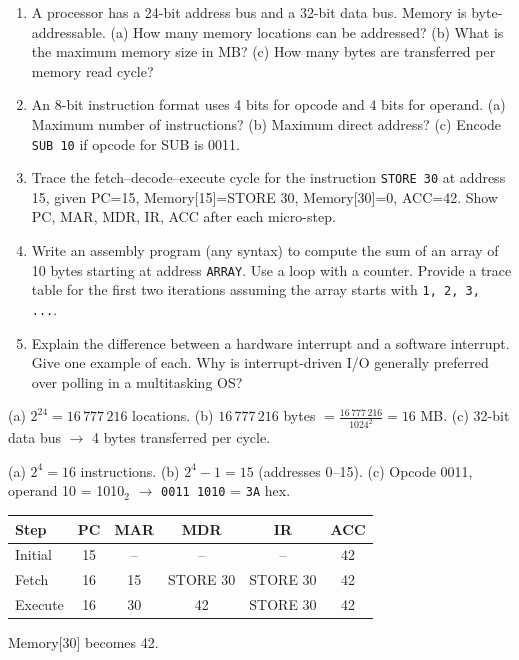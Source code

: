\documentclass[11pt]{article}
\begin{document}
\begin{exercice}
\begin{enumerate}
\item A processor has a 24-bit address bus and a 32-bit data bus. Memory is byte-addressable. (a) How many memory locations can be addressed? (b) What is the maximum memory size in MB? (c) How many bytes are transferred per memory read cycle?
\item An 8-bit instruction format uses 4 bits for opcode and 4 bits for operand. (a) Maximum number of instructions? (b) Maximum direct address? (c) Encode \texttt{SUB 10} if opcode for SUB is 0011.
\item Trace the fetch–decode–execute cycle for the instruction \texttt{STORE 30} at address 15, given PC=15, Memory[15]=STORE 30, Memory[30]=0, ACC=42. Show PC, MAR, MDR, IR, ACC after each micro-step.
\item Write an assembly program (any syntax) to compute the sum of an array of 10 bytes starting at address \texttt{ARRAY}. Use a loop with a counter. Provide a trace table for the first two iterations assuming the array starts with \texttt{1, 2, 3, ...}.
\item Explain the difference between a hardware interrupt and a software interrupt. Give one example of each. Why is interrupt-driven I/O generally preferred over polling in a multitasking OS?
\end{enumerate}
\end{exercice}

\begin{corrige}[Exercise 1]
(a) $2^{24} = 16\,777\,216$ locations. (b) $16\,777\,216$ bytes $= \frac{16\,777\,216}{1024^2} = 16$ MB. (c) 32-bit data bus $\rightarrow$ 4 bytes transferred per cycle.
\end{corrige}

\begin{corrige}[Exercise 2]
(a) $2^4 = 16$ instructions. (b) $2^4 - 1 = 15$ (addresses 0--15). (c) Opcode 0011, operand 10 = 1010$_2$ $\rightarrow$ \texttt{0011 1010} = \texttt{3A} hex.
\end{corrige}

\begin{corrige}[Exercise 3]
\begin{center}
\begin{tabular}{|l|c|c|c|c|c|}
\hline
\rowcolor{popblueL} Step & PC & MAR & MDR & IR & ACC \\ \hline
Initial & 15 & -- & -- & -- & 42 \\ \hline
Fetch & 16 & 15 & STORE 30 & STORE 30 & 42 \\ \hline
Execute & 16 & 30 & 42 & STORE 30 & 42 \\ \hline
\end{tabular}
\end{center}
Memory[30] becomes 42.
\end{corrige}
\end{document}
